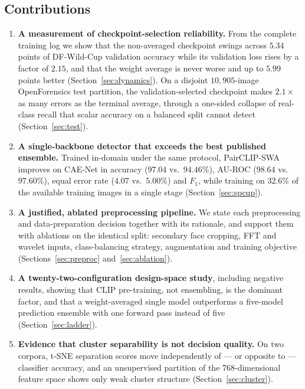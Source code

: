 \documentclass[10pt,journal]{IEEEtran}
\begin{document}
\subsection{Contributions}
\begin{enumerate}
\item \textbf{A measurement of checkpoint-selection reliability.} From the
complete training log we show that the non-averaged checkpoint swings across
$5.34$ points of DF-Wild-Cup validation accuracy while its validation loss
rises by a factor of $2.15$, and that the weight average is never worse and up
to $5.99$ points better (Section~\ref{sec:dynamics}). On a disjoint
$10{,}905$-image OpenForensics test partition, the validation-selected
checkpoint makes $2.1\times$ as many errors as the terminal average, through a
one-sided collapse of real-class recall that scalar accuracy on a balanced
split cannot detect (Section~\ref{sec:test}).

\item \textbf{A single-backbone detector that exceeds the best published
ensemble.} Trained in-domain under the same protocol, PairCLIP-SWA improves on
CAE-Net in accuracy ($97.04$ vs.\ $94.46\%$), AU-ROC ($98.64$ vs.\ $97.60\%$),
equal error rate ($4.07$ vs.\ $5.00\%$) and $F_1$, while training on $32.6\%$ of
the available training images in a single stage (Section~\ref{sec:spcup}).

\item \textbf{A justified, ablated preprocessing pipeline.} We state each
preprocessing and data-preparation decision together with its rationale, and
support them with ablations on the identical split: secondary face cropping,
FFT and wavelet inputs, class-balancing strategy, augmentation and training
objective (Sections~\ref{sec:preproc} and~\ref{sec:ablation}).

\item \textbf{A twenty-two-configuration design-space study}, including
negative results, showing that CLIP pre-training, not ensembling, is the
dominant factor, and that a weight-averaged single model outperforms a
five-model prediction ensemble with one forward pass instead of five
(Section~\ref{sec:ladder}).

\item \textbf{Evidence that cluster separability is not decision quality.} On
two corpora, t-SNE separation scores move independently of --- or opposite to
--- classifier accuracy, and an unsupervised partition of the $768$-dimensional
feature space shows only weak cluster structure (Section~\ref{sec:cluster}).
\end{enumerate}
\end{document}
